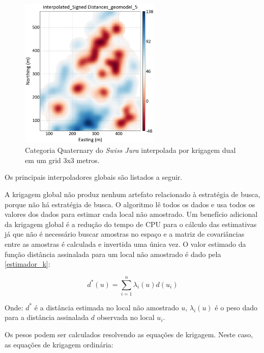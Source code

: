 \begin{figure}[H]
	\centering
	\caption{\label{interpsd5}Categoria Quaternary do \textit{Swiss Jura} interpolada por krigagem dual em um grid 3x3 metros.}
	\includegraphics[width=0.6\textwidth]{capitulo_2/imagens/int_sd_5.png}
\end{figure}

Os principais interpoladores globais são listados a seguir.


A krigagem global \cite{neufeldglobalkriging} não produz nenhum artefato relacionado à estratégia de busca, porque não há estratégia de busca. O algoritmo lê todos os dados e usa todos os valores dos dados para estimar cada local não amostrado. Um benefício adicional da krigagem global é a redução do tempo de CPU para o cálculo das estimativas já que não é necessário buscar amostras no espaço e a matriz de covariâncias entre as amostras é calculada e invertida uma única vez. O valor estimado da função distância assinalada para um local não amostrado é dado pela \autoref{estimador_k}:

\begin{equation}
\label{estimador_k}
d^*(u)=\sum_{i=1}^{n} \lambda_i(u) d(u_i)
\end{equation}

Onde: $d^*$ é a distância estimada no local não amostrado $u$, $\lambda_i(u)$ é o peso dado para a distância assinalada $d$ observada no local $u_i$.

Os pesos podem ser calculados resolvendo as equações de krigagem. Neste caso, as equações de krigagem ordinária:

